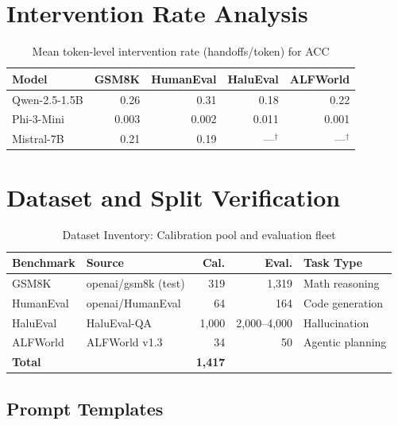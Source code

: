 \documentclass{uai2026}  %
\begin{document}
\section{Intervention Rate Analysis}
\label{app:intervention}

\begin{table}[H]
\centering
\caption{Mean token-level intervention rate (handoffs/token) for ACC}
\begin{tabular}{@{}lrrrr@{}}
\toprule
\textbf{Model} & \textbf{GSM8K} & \textbf{HumanEval} & \textbf{HaluEval} & \textbf{ALFWorld} \\
\midrule
Qwen-2.5-1.5B & 0.26 & 0.31 & 0.18 & 0.22 \\
Phi-3-Mini    & 0.003 & 0.002 & 0.011 & 0.001 \\
Mistral-7B    & 0.21 & 0.19 & ---$^\dagger$ & ---$^\dagger$ \\
\bottomrule
\end{tabular}
\end{table}

\section{Dataset and Split Verification}
\label{app:data}

\begin{table}[H]
\centering
\caption{Dataset Inventory: Calibration pool and evaluation fleet}
\begin{tabular}{@{}llrrl@{}}
\toprule
\textbf{Benchmark} & \textbf{Source} & \textbf{Cal.} & \textbf{Eval.} & \textbf{Task Type} \\
\midrule
GSM8K & openai/gsm8k (test) & 319 & 1,319 & Math reasoning \\
HumanEval & openai/HumanEval & 64 & 164 & Code generation \\
HaluEval & HaluEval-QA & 1,000 & 2,000--4,000 & Hallucination \\
ALFWorld & ALFWorld v1.3 & 34 & 50 & Agentic planning \\
\midrule
\textbf{Total} & & \textbf{1,417} & & \\
\bottomrule
\end{tabular}
\end{table}

\subsection{Prompt Templates}
\end{document}
